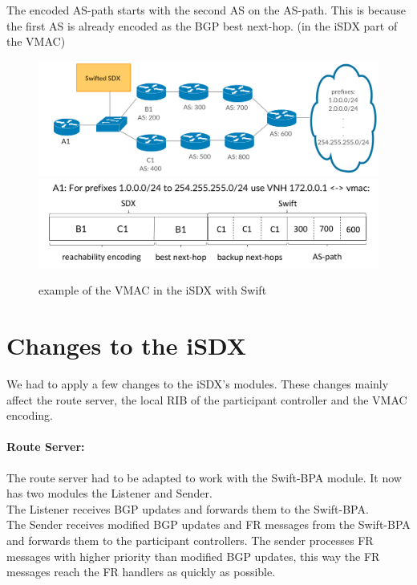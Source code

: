 The encoded AS-path starts with the second AS on the AS-path. This is because the first AS is already encoded as the BGP best next-hop. (in the iSDX part of the VMAC)

\begin{figure}[h]
\center
\includegraphics[scale = 0.24]{Figures/design_vmac_topology.pdf}
\includegraphics[scale = 0.35]{Figures/design_vmac_cropped.pdf}
\caption{example of the VMAC in the iSDX with Swift}
\end{figure}

\section{\label{chapter4:Changes_to_the_iSDX}Changes to the iSDX}

We had to apply a few changes to the iSDX's modules. These changes mainly affect the route server, the local RIB of the participant controller and the VMAC encoding. 

\paragraph{\label{chapter4:Changes to the iSDX:route server}Route Server:}

The route server had to be adapted to work with the Swift-BPA module. 
It now has two modules the Listener and Sender. \\
The Listener receives BGP updates and forwards them to the Swift-BPA. \\
The Sender receives modified BGP updates and FR messages from the Swift-BPA and forwards them to the participant controllers. The sender processes FR messages with higher priority than modified BGP updates, this way the FR messages reach the FR handlers as quickly as possible. 

